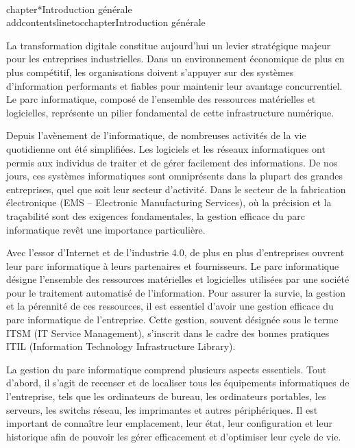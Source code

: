 \\chapter*{Introduction générale}
\\addcontentsline{toc}{chapter}{Introduction générale} %

La transformation digitale constitue aujourd'hui un levier stratégique majeur pour les entreprises industrielles. Dans un environnement économique de plus en plus compétitif, les organisations doivent s'appuyer sur des systèmes d'information performants et fiables pour maintenir leur avantage concurrentiel. Le parc informatique, composé de l'ensemble des ressources matérielles et logicielles, représente un pilier fondamental de cette infrastructure numérique.

Depuis l'avènement de l'informatique, de nombreuses activités de la vie quotidienne ont été simplifiées. Les logiciels et les réseaux informatiques ont permis aux individus de traiter et de gérer facilement des informations. De nos jours, ces systèmes informatiques sont omniprésents dans la plupart des grandes entreprises, quel que soit leur secteur d'activité. Dans le secteur de la fabrication électronique (EMS -- Electronic Manufacturing Services), où la précision et la traçabilité sont des exigences fondamentales, la gestion efficace du parc informatique revêt une importance particulière.

Avec l'essor d'Internet et de l'industrie 4.0, de plus en plus d'entreprises ouvrent leur parc informatique à leurs partenaires et fournisseurs. Le parc informatique désigne l'ensemble des ressources matérielles et logicielles utilisées par une société pour le traitement automatisé de l'information. Pour assurer la survie, la gestion et la pérennité de ces ressources, il est essentiel d'avoir une gestion efficace du parc informatique de l'entreprise. Cette gestion, souvent désignée sous le terme ITSM (IT Service Management), s'inscrit dans le cadre des bonnes pratiques ITIL (Information Technology Infrastructure Library).

La gestion du parc informatique comprend plusieurs aspects essentiels. Tout d'abord, il s'agit de recenser et de localiser tous les équipements informatiques de l'entreprise, tels que les ordinateurs de bureau, les ordinateurs portables, les serveurs, les switchs réseau, les imprimantes et autres périphériques. Il est important de connaître leur emplacement, leur état, leur configuration et leur historique afin de pouvoir les gérer efficacement et d'optimiser leur cycle de vie.

